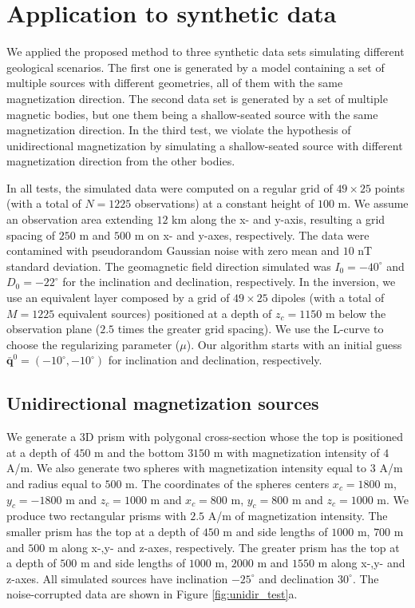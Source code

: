 \section{Application to synthetic data}
\label{sec:synt_tests}

We applied the proposed method to three synthetic data sets simulating different geological scenarios. The first one is generated by a model containing a set of multiple sources with different geometries, all of them with the same magnetization direction. The second data set is generated by a set of multiple magnetic bodies, but one them being a shallow-seated source with the same magnetization direction. In the third test, we violate the hypothesis of unidirectional magnetization by simulating a shallow-seated source with different magnetization direction from the other bodies.

In all tests, the simulated data were computed on a regular grid of $49 \times 25$ points (with a total of $N = 1225$ observations) at a constant height of $100$ m.  We assume an observation area extending $12$ km along the x- and y-axis, resulting a grid spacing of $250$ m and $500$ m on x- and y-axes, respectively. The data were contamined with pseudorandom Gaussian noise with zero mean and $10$ nT standard deviation. The geomagnetic field direction simulated was $I_0 = -40^\circ$ and $D_0 = -22^\circ$ for the inclination and declination, respectively. In the inversion, we use an equivalent layer composed by a grid of $49 \times 25$ dipoles (with a total of $M = 1225$ equivalent sources) positioned at a depth of $z_c = 1150$ m below the observation plane ($2.5$ times the greater grid spacing). We use the L-curve to choose the regularizing parameter ($\mu$). Our algorithm starts with an initial guess $\bar{\mathbf{q}}^{0} = (-10^\circ,-10^\circ)$ for inclination and declination, respectively.

\subsection{Unidirectional magnetization sources}
 
We generate a 3D prism with polygonal cross-section whose the top is positioned at a depth of $450$ m and the bottom $3150$ m with magnetization intensity of $4$ A/m. We also generate two spheres with magnetization intensity equal to $3$ A/m and radius equal to $500$ m. The coordinates of the spheres centers $x_c = 1800$ m, $y_c = -1800$ m and $z_c = 1000$ m and $x_c = 800$ m, $y_c = 800$ m and $z_c= 1000$ m. We produce two rectangular prisms with $2.5$ A/m of magnetization intensity. The smaller prism has the top at a depth of $450$ m and side lengths of $1000$ m, $700$ m and $500$ m along x-,y- and z-axes, respectively. The greater prism has the top at a depth of $500$ m and side lengths of $1000$ m, $2000$ m and $1550$ m along x-,y- and z-axes. All simulated sources have inclination $-25^\circ$ and declination $30^\circ$. The noise-corrupted data are shown in Figure \ref{fig:unidir_test}a. 

